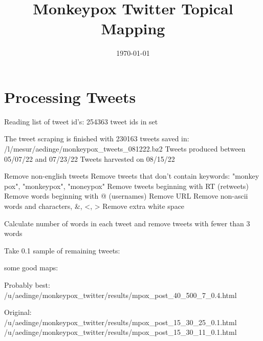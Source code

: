 \documentclass[12pt]{article} %
\begin{document}

\title{Monkeypox Twitter Topical Mapping} %
\date{\today}
\maketitle %
\section{Processing Tweets}\label{sec:processing_tweets}

Reading list of tweet id's: 254363 tweet ids in set \cite{thakur_2022}

The tweet scraping is finished with 230163 tweets saved in: /l/mesur/aedinge/monkeypox_tweets_081222.bz2
Tweets produced between 05/07/22 and 07/23/22
Tweets harvested on 08/15/22

Remove non-english tweets
Remove tweets that don't contain keywords: "monkey pox", "monkeypox", "moneypox"
Remove tweets beginning with RT (retweets)
Remove words beginning with @ (usernames)
Remove URL
Remove non-ascii words and characters, &, <, >
Remove extra white space

Calculate number of words in each tweet and remove tweets with fewer than 3 words

Take 0.1 sample of remaining tweets:

some good maps:

Probably best:
/u/aedinge/monkeypox_twitter/results/mpox_post_40_500_7_0.4.html

Original:
/u/aedinge/monkeypox_twitter/results/mpox_post_15_30_25_0.1.html
/u/aedinge/monkeypox_twitter/results/mpox_post_15_30_11_0.1.html






\printbibliography{}
    
\end{document}
